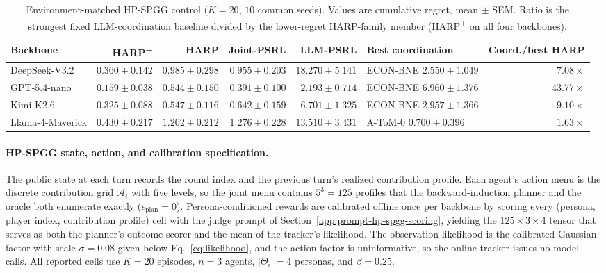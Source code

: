 \begin{table}[t]
\centering\scriptsize
\caption{Environment-matched HP-SPGG control ($K{=}20$, $10$ common seeds). Values are cumulative regret, mean $\pm$ SEM. Ratio is the strongest fixed LLM-coordination baseline divided by the lower-regret HARP-family member (HARP\textsuperscript{+} on all four backbones).}
\label{tab:hp-spgg-matched}
\setlength{\tabcolsep}{3pt}
\begin{tabular}{lrrrrlr}
\toprule
Backbone & HARP\textsuperscript{+} & HARP & Joint-PSRL & LLM-PSRL & Best coordination & Coord./best HARP \\
\midrule
DeepSeek-V3.2 & $0.360\pm0.142$ & $0.985\pm0.298$ & $0.955\pm0.203$ & $18.270\pm5.141$ & ECON-BNE $2.550\pm1.049$ & $7.08\times$ \\
GPT-5.4-nano & $0.159\pm0.038$ & $0.544\pm0.150$ & $0.391\pm0.100$ & $2.193\pm0.714$ & ECON-BNE $6.960\pm1.376$ & $43.77\times$ \\
Kimi-K2.6 & $0.325\pm0.088$ & $0.547\pm0.116$ & $0.642\pm0.159$ & $6.701\pm1.325$ & ECON-BNE $2.957\pm1.366$ & $9.10\times$ \\
Llama-4-Maverick & $0.430\pm0.217$ & $1.202\pm0.212$ & $1.276\pm0.228$ & $13.510\pm3.431$ & A-ToM-0 $0.700\pm0.396$ & $1.63\times$ \\
\bottomrule
\end{tabular}
\end{table}
\paragraph{HP-SPGG state, action, and calibration specification.}
The public state at each turn records the round index and the previous turn's realized contribution profile. Each agent's action menu is the discrete contribution grid $\mathcal A_i$ with five levels, so the joint menu contains $5^3{=}125$ profiles that the backward-induction planner and the oracle both enumerate exactly ($\epsilon_{\mathrm{plan}}{=}0$). Persona-conditioned rewards are calibrated offline once per backbone by scoring every (persona, player index, contribution profile) cell with the judge prompt of Section~\ref{app:prompt-hp-spgg-scoring}, yielding the $125\times3\times4$ tensor that serves as both the planner's outcome scorer and the mean of the tracker's likelihood. The observation likelihood is the calibrated Gaussian factor with scale $\sigma{=}0.08$ given below Eq.~\eqref{eq:likelihood}, and the action factor is uninformative, so the online tracker issues no model calls. All reported cells use $K{=}20$ episodes, $n{=}3$ agents, $|\Theta_i|{=}4$ personas, and $\beta{=}0.25$.
